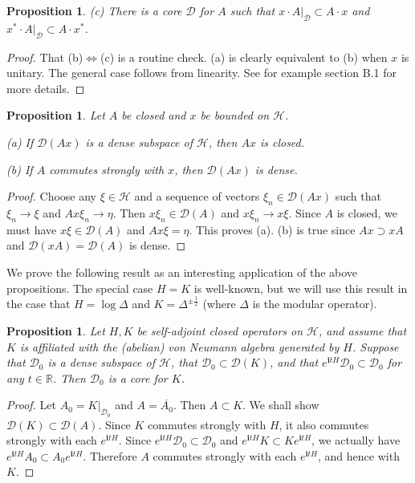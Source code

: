 \documentclass[11pt,b5paper,notitlepage]{article}
\theoremstyle{definition}
\theoremstyle{plain}
\newtheorem{pp}[df]{Proposition}
\newcommand{\mc}{\mathcal}
\newcommand{\ovl}{\overline}
\newcommand{\Dom}{\scr D}
\newcommand{\scr}{\mathscr}
\newcommand{\im}{\mathbf{i}}
\newcommand{\mbb}{\mathbb}
\numberwithin{equation}{subsection}
\begin{document}
\begin{subappendices}
\begin{pp}
	(c) There is a core $\Dom$ for $A$ such that $x\cdot A|_\Dom\subset A\cdot x$ and $x^*\cdot A|_\Dom\subset A\cdot x^*$. 
\end{pp}

\begin{proof}
	That (b)$\Longleftrightarrow$(c) is a routine check.  (a) is clearly equivalent to (b) when $x$ is unitary. The general case follows from linearity. See for example \cite{Gui19a} section B.1 for more details.
\end{proof}


\begin{pp}\label{lb16}
	Let $A$ be closed and $x$ be bounded on $\mc H$.
	
	(a) If $\Dom(Ax)$ is a dense subspace of $\mc H$, then $Ax$ is closed.
	
	(b) If $A$ commutes strongly with $x$, then $\Dom(Ax)$ is dense.
\end{pp}

\begin{proof}
	Choose any $\xi\in\mc H$ and a sequence of vectors $\xi_n\in\Dom(Ax)$ such that  $\xi_n\rightarrow\xi$ and $Ax\xi_n\rightarrow\eta$. Then $x\xi_n\in\Dom(A)$ and $x\xi_n\rightarrow x\xi$. Since $A$ is closed, we must have $x\xi\in\Dom(A)$ and $Ax\xi=\eta$. This proves (a). (b) is true since $Ax\supset xA$ and $\Dom(xA)=\Dom(A)$ is dense.
\end{proof}



We prove the following result as an interesting application of the above propositions. The special case $H=K$ is well-known, but we will use this result in the case that  $H=\log\Delta$ and $K=\Delta^{\pm\frac 12}$ (where $\Delta$ is the modular operator). 

\begin{pp}\label{lb38}
	Let $H,K$ be  self-adjoint closed operators on $\mc H$, and assume that $K$ is  affiliated with the (abelian) von Neumann algebra generated by $H$. Suppose that $\scr D_0$ is a dense subspace of $\mc H$, that $\scr D_0\subset\Dom(K)$, and that $e^{\im tH}\scr D_0\subset\scr D_0$ for any $t\in\mbb R$. Then $\scr D_0$ is a core for $K$.
\end{pp}

\begin{proof}
	Let $A_0=K|_{\scr D_0}$ and $A=\ovl{A_0}$. Then $A\subset K$. We shall show $\Dom(K)\subset\Dom(A)$. Since $K$ commutes strongly with $H$, it also commutes strongly with each $e^{\im tH}$. Since  $e^{\im tH}\scr D_0\subset\scr D_0$ and $e^{\im tH}K\subset Ke^{\im tH}$, we actually have $e^{\im tH}A_0\subset A_0e^{\im tH}$. Therefore $A$ commutes strongly with each $e^{\im tH}$, and hence with $K$.
	

\end{proof}
\end{subappendices}
\end{document}

